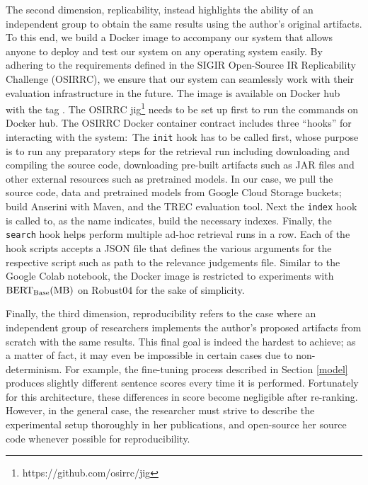 The second dimension, replicability, instead highlights the ability of an independent group to obtain the same results using the author's original artifacts.
To this end, we build a Docker image to accompany our system that allows anyone to deploy and test our system on any operating system easily.
By adhering to the requirements defined in the SIGIR Open-Source IR Replicability Challenge (OSIRRC), we ensure that our system can seamlessly work with their evaluation infrastructure in the future.
The image is available on Docker hub with the tag .
The OSIRRC jig\footnote{https://github.com/osirrc/jig} needs to be set up first to run the commands on Docker hub.
The OSIRRC Docker container contract includes three ``hooks'' for interacting with the system:\
The \texttt{init} hook has to be called first, whose purpose is to run any preparatory steps for the retrieval run including downloading and compiling the source code, downloading pre-built artifacts such as JAR files and other external resources such as pretrained models.
In our case, we pull the source code, data and pretrained models from Google Cloud Storage buckets; build Anserini with Maven, and the TREC evaluation tool.
Next the \texttt{index} hook is called to, as the name indicates, build the necessary indexes.
Finally, the \texttt{search} hook helps perform multiple ad-hoc retrieval runs in a row.
Each of the hook scripts accepts a JSON file that defines the various arguments for the respective script such as path to the relevance judgements file.
Similar to the Google Colab notebook, the Docker image is restricted to experiments with $ \textrm{BERT}_{\textrm{\scriptsize Base}}(\textrm{MB})$ on Robust04 for the sake of simplicity.

Finally, the third dimension, reproducibility refers to the case where an independent group of researchers implements the author's proposed artifacts from scratch with the same results.
This final goal is indeed the hardest to achieve; as a matter of fact, it may even be impossible in certain cases due to non-determinism.
For example, the fine-tuning process described in Section \ref{model} produces slightly different sentence scores every time it is performed.
Fortunately for this architecture, these differences in score become negligible after re-ranking.
However, in the general case, the researcher must strive to describe the experimental setup thoroughly in her publications, and open-source her source code whenever possible for reproducibility.

\myworries{Demo stuff?}